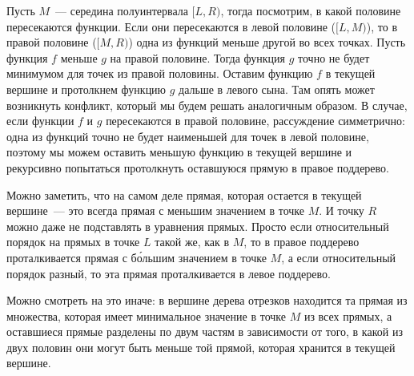 Пусть $M$~--- середина полуинтервала $[L, R)$, тогда посмотрим, в какой половине пересекаются функции. Если они пересекаются в левой половине ($[L, M)$), то в правой половине ($[M, R)$) одна из функций меньше другой во всех точках. Пусть функция $f$ меньше $g$ на правой половине. Тогда функция $g$ точно не будет минимумом для точек из правой половины. Оставим функцию $f$ в текущей вершине и протолкнем функцию $g$ дальше в левого сына. Там опять может возникнуть конфликт, который мы будем решать аналогичным образом. В случае, если функции $f$ и $g$ пересекаются в правой половине, рассуждение симметрично: одна из функций точно не будет наименьшей для точек в левой половине, поэтому мы можем оставить меньшую функцию в текущей вершине и рекурсивно попытаться протолкнуть оставшуюся прямую в правое поддерево.


Можно заметить, что на самом деле прямая, которая остается в текущей вершине~--- это всегда прямая с меньшим значением в точке $M$. И точку $R$ можно даже не подставлять в уравнения прямых. Просто если относительный порядок на прямых в точке $L$ такой же, как в $M$, то в правое поддерево проталкивается прямая с б\'{о}льшим значением в точке $M$, а если относительный порядок разный, то эта прямая проталкивается в левое поддерево.

Можно смотреть на это иначе: в вершине дерева отрезков находится та прямая из множества, которая имеет минимальное значение в точке $M$ из всех прямых, а оставшиеся прямые разделены по двум частям в зависимости от того, в какой из двух половин они могут быть меньше той прямой, которая хранится в текущей вершине.

